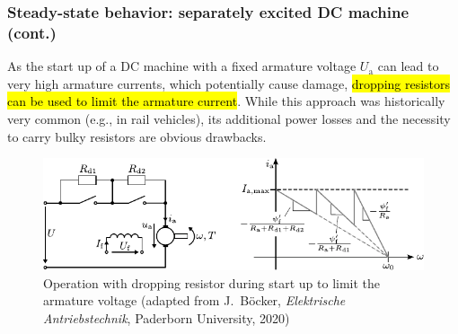 \begin{frame}
	\frametitle{Steady-state behavior: separately excited DC machine (cont.)}
			As the start up of a DC machine with a fixed armature voltage $U_\mathrm{a}$ can lead to very high armature currents, which potentially cause damage, \hl{dropping resistors can be used to limit the armature current}. While this approach was historically very common (e.g., in rail vehicles), its additional power losses and the necessity to carry bulky resistors are obvious drawbacks. 
		\begin{figure}
				\centering
				\includegraphics[scale=1.1]{fig/lec03/DC_machine_dropping_resistor.pdf}
				\caption{Operation with dropping resistor during start up to limit the armature voltage (adapted from J.~B\"ocker, \textit{Elektrische Antriebstechnik}, Paderborn University, 2020)}
				\label{fig:DC_machine_dropping_resistor}
		\end{figure}
\end{frame}

